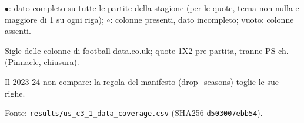 \begin{table}[htbp]
\smallskip
\begin{minipage}{\linewidth}
\footnotesize
$\bullet$: dato completo su tutte le partite della stagione (per le quote, terna non nulla e maggiore di 1 su ogni riga); $\circ$: colonne presenti, dato incompleto; vuoto: colonne assenti.\par
Sigle delle colonne di football-data.co.uk; quote 1X2 pre-partita, tranne PS ch. (Pinnacle, chiusura).\par
Il 2023-24 non compare: la regola del manifesto (drop\_seasons) toglie le sue righe.\par
Fonte: \texttt{results/us\_c3\_1\_data\_coverage.csv} (SHA256 \texttt{d503007ebb54}).
\end{minipage}
\end{table}
